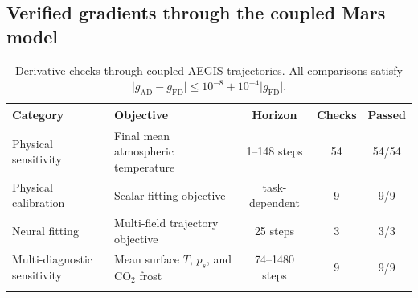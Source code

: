 \documentclass{article} %
\newcommand{\co}{CO$_2$}
\begin{document}

% 


\subsection{Verified gradients through the coupled Mars model}

\begin{table}[t]
\centering
\small
\caption{Derivative checks through coupled AEGIS trajectories. All
comparisons satisfy
\(\lvert g_{\mathrm{AD}}-g_{\mathrm{FD}}\rvert
\leq10^{-8}+10^{-4}\lvert g_{\mathrm{FD}}\rvert\).}
\label{tab:derivative_checks}
\begin{tabular}{llccc}
\toprule
Category & Objective & Horizon & Checks & Passed \\
\midrule
Physical sensitivity &
Final mean atmospheric temperature &
1--148 steps &
54 &
54/54 \\

Physical calibration &
Scalar fitting objective &
task-dependent &
9 &
9/9 \\

Neural fitting &
Multi-field trajectory objective &
25 steps &
3 &
3/3 \\

Multi-diagnostic sensitivity &
Mean surface $T$, $p_s$, and \co{} frost &
74--1480 steps &
9 &
9/9 \\
\bottomrule
\label{diff-table}
\end{tabular}
\end{table}
\end{document}
